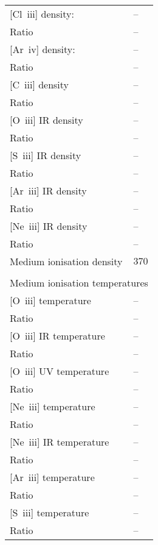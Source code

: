 \begin{longtable}[l]{ll}
 {}[Cl~{\sc iii}] density:           & -- \\
 Ratio                               & -- \\
 {}[Ar~{\sc iv}] density:            & -- \\
 Ratio                               & -- \\
 {}[C~{\sc iii}] density             & -- \\
 Ratio                               & -- \\
 {}[O~{\sc iii}] IR density          & -- \\
 Ratio                               & -- \\
 {}[S~{\sc iii}] IR density          & -- \\
 Ratio                               & -- \\
 {}[Ar~{\sc iii}] IR density         & -- \\
 Ratio                               & -- \\
 {}[Ne~{\sc iii}] IR density         & -- \\
 Ratio                               & -- \\
 Medium ionisation density           & $  370$\\
 \vspace{0.2cm}\\\multicolumn{2}{l}{Medium ionisation temperatures}\\ \hline
 {}[O~{\sc iii}] temperature         & -- \\
 Ratio                               & -- \\
 {}[O~{\sc iii}] IR temperature      & -- \\
 Ratio                               & -- \\
 {}[O~{\sc iii}] UV temperature      & -- \\
 Ratio                               & -- \\
 {}[Ne~{\sc iii}] temperature        & -- \\
 Ratio                               & -- \\
 {}[Ne~{\sc iii}] IR temperature     & -- \\
 Ratio                               & -- \\
 {}[Ar~{\sc iii}] temperature        & -- \\
 Ratio                               & -- \\
 {}[S~{\sc iii}] temperature         & -- \\
 Ratio                               & -- \\

\end{longtable}
